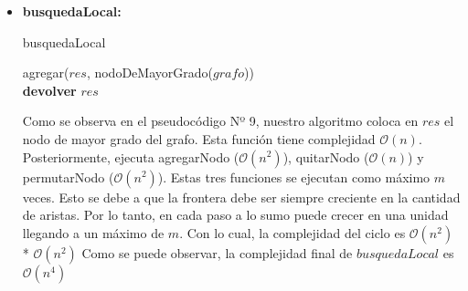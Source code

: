 \begin{itemize}
\item \textbf{busquedaLocal:} \newline 

\begin{algorithm}[H]
    \SetAlgoLined
    \caption{busquedaLocal}
	
    agregar($res$, nodoDeMayorGrado($grafo$))\\
    	
    \textbf{devolver} $res$ \\
\end{algorithm}

Como se observa en el pseudocódigo Nº 9, nuestro algoritmo coloca en $res$ el nodo de mayor grado del grafo. Esta función tiene complejidad $\mathcal{O}(n)$. Posteriormente, ejecuta agregarNodo ($\mathcal{O}(n^{2})$), quitarNodo ($\mathcal{O}(n)$) y permutarNodo ($\mathcal{O}(n^{2})$). Estas tres funciones se ejecutan como máximo $m$ veces. Esto se debe a que la frontera debe ser siempre creciente en la cantidad de aristas. Por lo tanto, en cada paso a lo sumo puede crecer en una unidad llegando a un máximo de $m$. Con lo cual, la complejidad del ciclo es $\mathcal{O}(n^{2})$ * $\mathcal{O}(n^{2})$
\newline
Como se puede observar, la complejidad final de $busquedaLocal$ es $\mathcal{O}(n^{4})$


\end{itemize}
